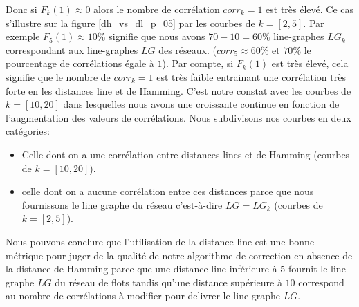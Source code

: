 \newline
Donc si $F_k(1) \approx 0$ alors le nombre de corr\'elation $corr_k = 1$ est tr\`es \'elev\'e. Ce cas s'illustre sur la figure \ref{dh_vs_dl_p_05} par les courbes de $k=[2,5]$. 
Par exemple $F_5(1) \approx 10\%$ signifie que nous avons $70-10=60\%$ line-graphes $LG_k$ correspondant aux line-graphes $LG$ des r\'eseaux. ($corr_5 \approx 60\%$ et $70\%$ le pourcentage de corr\'elations \'egale \`a $1$).
\newline
Par compte, si  $F_k(1)$ est tr\`es \'elev\'e, cela signifie que le nombre de $corr_k = 1$ est tr\`es faible entrainant une corr\'elation tr\`es forte en les distances line et de Hamming.
C'est notre constat avec les courbes de $k = [10,20]$ dans lesquelles nous avons une  croissante continue en fonction de l'augmentation des valeurs de corr\'elations.
\newline
Nous subdivisons nos courbes en deux cat\'egories:
\begin{itemize}
	\item Celle dont on a une corr\'elation entre distances lines et de Hamming (courbes de $k = [10,20]$).
	\item celle dont on a aucune corr\'elation entre ces distances parce que nous fournissons le line graphe du r\'eseau c'est-\`a-dire  $LG = LG_k$ (courbes de $k = [2,5]$). 
\end{itemize}
Nous pouvons conclure que l'utilisation de la distance line est une bonne m\'etrique pour juger de la qualit\'e de notre algorithme de correction en absence de la distance de Hamming parce que une distance line inf\'erieure \`a $5$ fournit le line-graphe $LG$ du r\'eseau de flots tandis qu'une distance sup\'erieure \`a $10$ correspond au nombre de corr\'elations \`a modifier pour delivrer le line-graphe $LG$. 